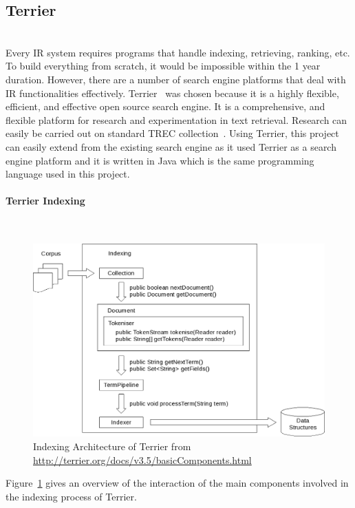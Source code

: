 \subsection{Terrier}\label{section:terrier} \hspace{0pt} \\
Every IR system requires programs that handle indexing, retrieving, ranking, etc. To build everything from scratch, it would be impossible within
the 1 year duration. However, there are a number of search engine platforms that deal with IR functionalities effectively.
Terrier~\cite{terrier} was chosen because it is a highly flexible, efficient, and effective open source search engine.
It is a comprehensive, and flexible platform for research and experimentation in text retrieval. Research can easily be 
carried out on standard TREC collection~\cite{trec}. 
Using Terrier, this project can easily extend from the existing search engine as it used Terrier as a search engine platform and it is written in Java
which is the same programming language used in this project.

\paragraph{Terrier Indexing} \hspace{0pt} \\
\begin{figure}
\centering
\includegraphics[scale=0.3]{./figures/terrierindexing.png}
\caption{Indexing Architecture of Terrier from \protect\url{http://terrier.org/docs/v3.5/basicComponents.html}} \label{fig:terrierindexing} 
\end{figure}

Figure~\ref{fig:terrierindexing} gives an overview of the interaction of the main components involved in the indexing process of Terrier.

